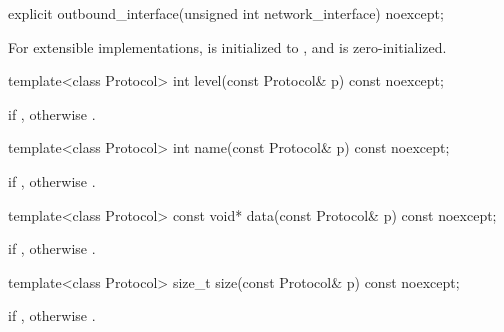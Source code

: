\begin{itemdecl}
explicit outbound_interface(unsigned int network_interface) noexcept;
\end{itemdecl}

\begin{itemdescr}
\pnum
\effects For extensible implementations,  is initialized to , and  is zero-initialized.
\end{itemdescr}

\begin{itemdecl}
template<class Protocol> int level(const Protocol& p) const noexcept;
\end{itemdecl}

\begin{itemdescr}
\pnum
\returns {} if , otherwise .
\end{itemdescr}

\begin{itemdecl}
template<class Protocol> int name(const Protocol& p) const noexcept;
\end{itemdecl}

\begin{itemdescr}
\pnum
\returns {} if , otherwise .
\end{itemdescr}

\begin{itemdecl}
template<class Protocol> const void* data(const Protocol& p) const noexcept;
\end{itemdecl}

\begin{itemdescr}
\pnum
\returns {} if , otherwise .
\end{itemdescr}

\begin{itemdecl}
template<class Protocol> size_t size(const Protocol& p) const noexcept;
\end{itemdecl}

\begin{itemdescr}
\pnum
\returns {} if , otherwise .
\end{itemdescr}




